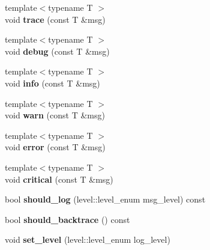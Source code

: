 \begin{DoxyCompactItemize}
\item 
\mbox{\label{classspdlog_1_1logger_a66e008d30a46c33283c4546f3851a80a}} 
{\footnotesize template$<$typename T $>$ }\\void {\bfseries trace} (const T \&msg)
\item 
\mbox{\label{classspdlog_1_1logger_aca96637e71ab459738ccc7287be28c2e}} 
{\footnotesize template$<$typename T $>$ }\\void {\bfseries debug} (const T \&msg)
\item 
\mbox{\label{classspdlog_1_1logger_a1e1dff0caa0d1bf072739dfcc1e331d8}} 
{\footnotesize template$<$typename T $>$ }\\void {\bfseries info} (const T \&msg)
\item 
\mbox{\label{classspdlog_1_1logger_af9153fa3a0735a535ea56f684dc53256}} 
{\footnotesize template$<$typename T $>$ }\\void {\bfseries warn} (const T \&msg)
\item 
\mbox{\label{classspdlog_1_1logger_a9ce73acaa12b7dbbecde6ac3bc7353e5}} 
{\footnotesize template$<$typename T $>$ }\\void {\bfseries error} (const T \&msg)
\item 
\mbox{\label{classspdlog_1_1logger_a3c5140393ec153b2b8478361aac80eb6}} 
{\footnotesize template$<$typename T $>$ }\\void {\bfseries critical} (const T \&msg)
\item 
\mbox{\label{classspdlog_1_1logger_a94c77395570c462953ded4188aaaf655}} 
bool {\bfseries should\+\_\+log} (level\+::level\+\_\+enum msg\+\_\+level) const
\item 
\mbox{\label{classspdlog_1_1logger_a1a1bcc96a0ca719475685800a8802379}} 
bool {\bfseries should\+\_\+backtrace} () const
\item 
\mbox{\label{classspdlog_1_1logger_aeaf7078135688ea4df96ea8c8e11e0e7}} 
void {\bfseries set\+\_\+level} (level\+::level\+\_\+enum log\+\_\+level)

\end{DoxyCompactItemize}

